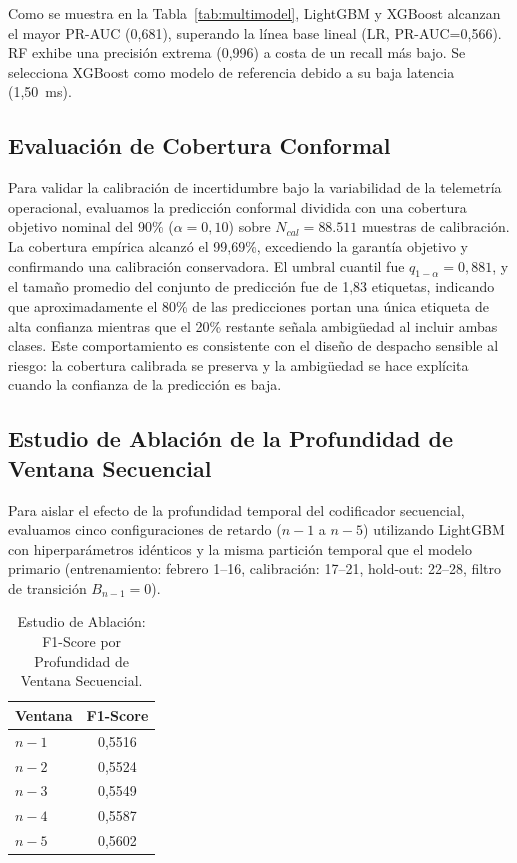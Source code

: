 \documentclass[fleqn,10pt,lineno]{wlpeerj}
\begin{document}
Como se muestra en la Tabla~\ref{tab:multimodel}, LightGBM y XGBoost alcanzan el mayor PR-AUC (0,681), superando la l\'inea base lineal (LR, PR-AUC=0,566). RF exhibe una precisi\'on extrema (0,996) a costa de un recall m\'as bajo. Se selecciona XGBoost como modelo de referencia debido a su baja latencia (1,50~ms).

\subsection{Evaluaci\'on de Cobertura Conformal}

Para validar la calibraci\'on de incertidumbre bajo la variabilidad de la telemetr\'ia operacional, evaluamos la predicci\'on conformal dividida con una cobertura objetivo nominal del 90\% ($\alpha=0,10$) sobre $N_{cal}=88.511$ muestras de calibraci\'on. La cobertura emp\'irica alcanz\'o el 99,69\%, excediendo la garant\'ia objetivo y confirmando una calibraci\'on conservadora. El umbral cuantil fue $q_{1-\alpha}=0,881$, y el tama\~no promedio del conjunto de predicci\'on fue de 1,83 etiquetas, indicando que aproximadamente el 80\% de las predicciones portan una \'unica etiqueta de alta confianza mientras que el 20\% restante se\~nala ambig\"uedad al incluir ambas clases. Este comportamiento es consistente con el dise\~no de despacho sensible al riesgo: la cobertura calibrada se preserva y la ambig\"uedad se hace expl\'icita cuando la confianza de la predicci\'on es baja.

\subsection{Estudio de Ablaci\'on de la Profundidad de Ventana Secuencial}
\label{sec:ablation}

Para aislar el efecto de la profundidad temporal del codificador secuencial, evaluamos cinco configuraciones de retardo ($n{-}1$ a $n{-}5$) utilizando LightGBM con hiperpar\'ametros id\'enticos y la misma partici\'on temporal que el modelo primario (entrenamiento: febrero 1--16, calibraci\'on: 17--21, hold-out: 22--28, filtro de transici\'on $B_{n-1}=0$).

\begin{table}[htbp]
  \caption{Estudio de Ablaci\'on: F1-Score por Profundidad de Ventana Secuencial.}
  \centering
  \begin{tabular}{@{}lc@{}}
    \toprule
    \textbf{Ventana} & \textbf{F1-Score} \\ \midrule
    $n-1$           & 0,5516             \\
    $n-2$           & 0,5524             \\
    $n-3$           & 0,5549             \\
    $n-4$           & 0,5587             \\
    $n-5$           & 0,5602             \\ \bottomrule
  \end{tabular}
  \label{tab:ablation}
\end{table}
\end{document}
